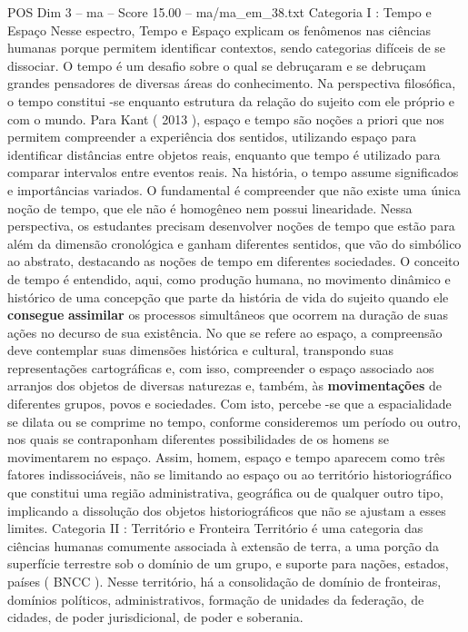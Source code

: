 \begin{textsample}{POS Dim 3 – ma – Score 15.00 – ma/ma\_em\_38.txt}  \label{ex:f3_pos_150}
Categoria I : Tempo e Espaço Nesse espectro, Tempo e Espaço explicam os fenômenos nas ciências humanas porque permitem identificar contextos, sendo categorias difíceis de se dissociar.
O tempo é um desafio sobre o qual se debruçaram e se debruçam grandes pensadores de diversas áreas do conhecimento.
Na perspectiva filosófica, o tempo constitui -se enquanto estrutura da relação do sujeito com ele próprio e com o mundo.
Para Kant ( 2013 ), espaço e tempo são noções a priori que nos permitem compreender a experiência dos sentidos, utilizando espaço para identificar distâncias entre objetos reais, enquanto que tempo é utilizado para comparar intervalos entre eventos reais.
Na história, o tempo assume significados e importâncias variados.
O fundamental é compreender que não existe uma única noção de tempo, que ele não é homogêneo nem possui linearidade.
Nessa perspectiva, os estudantes precisam desenvolver noções de tempo que estão para além da dimensão cronológica e ganham diferentes sentidos, que vão do simbólico ao abstrato, destacando as noções de tempo em diferentes sociedades.
O conceito de tempo é entendido, aqui, como produção humana, no movimento dinâmico e histórico de uma concepção que parte da história de vida do sujeito quando ele \textbf{consegue} \textbf{assimilar} os processos simultâneos que ocorrem na duração de suas ações no decurso de sua existência.
No que se refere ao espaço, a compreensão deve contemplar suas dimensões histórica e cultural, transpondo suas representações cartográficas e, com isso, compreender o espaço associado aos arranjos dos objetos de diversas naturezas e, também, às \textbf{movimentações} de diferentes grupos, povos e sociedades.
Com isto, percebe -se que a espacialidade se dilata ou se comprime no tempo, conforme consideremos um período ou outro, nos quais se contraponham diferentes possibilidades de os homens se movimentarem no espaço.
Assim, homem, espaço e tempo aparecem como três fatores indissociáveis, não se limitando ao espaço ou ao território historiográfico que constitui uma região administrativa, geográfica ou de qualquer outro tipo, implicando a dissolução dos objetos historiográficos que não se ajustam a esses limites.
Categoria II : Território e Fronteira Território é uma categoria das ciências humanas comumente associada à extensão de terra, a uma porção da superfície terrestre sob o domínio de um grupo, e suporte para nações, estados, países ( BNCC ).
Nesse território, há a consolidação de domínio de fronteiras, domínios políticos, administrativos, formação de unidades da federação, de cidades, de poder jurisdicional, de poder e soberania.

\end{textsample}
